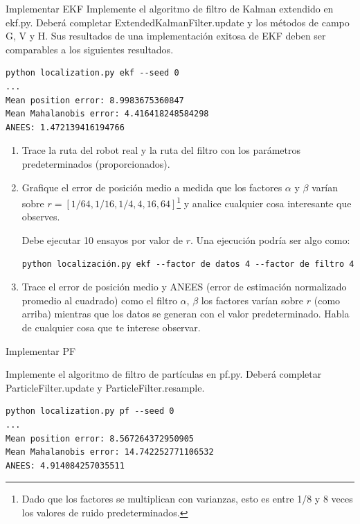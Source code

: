 \documentclass[tp]{lcc}
\begin{document}
	\ejercicio Implementar EKF
	Implemente el algoritmo de filtro de Kalman extendido en ekf.py. Deberá completar ExtendedKalmanFilter.update
	y los métodos de campo G, V y H. Sus resultados de una implementación exitosa de EKF deben ser comparables
	a los siguientes resultados.

\begin{lstlisting}[style=bash] 
python localization.py ekf --seed 0
...
Mean position error: 8.9983675360847
Mean Mahalanobis error: 4.416418248584298
ANEES: 1.472139416194766
\end{lstlisting}


	\begin{enumerate}
		\item Trace la ruta del robot real y la ruta del filtro con los parámetros predeterminados (proporcionados).
		\item  Grafique el error de posición medio a medida que los factores $\alpha$ y $\beta$ varían sobre $r = [1/64, 1/16, 1/4, 4, 16, 64]$\footnote{Dado que los factores se multiplican con varianzas, esto es entre 1/8 y 8 veces los valores de ruido predeterminados.} y analice cualquier cosa interesante que observes.
		
		Debe ejecutar 10 ensayos por valor de $r$. Una ejecución podría ser algo como:

\begin{lstlisting}[style=bash] 
python localización.py ekf --factor de datos 4 --factor de filtro 4
\end{lstlisting}

		\item Trace el error de posición medio y ANEES (error de estimación normalizado promedio al cuadrado) como el filtro $\alpha$, $\beta$ los factores varían sobre $r$ (como arriba) mientras que los datos se generan con el valor predeterminado. Habla de cualquier cosa que te interese observar.
	\end{enumerate}


	\ejercicio Implementar PF
	
	Implemente el algoritmo de filtro de partículas en pf.py. Deberá completar ParticleFilter.update y ParticleFilter.resample.

\begin{lstlisting}[style=bash] 
python localization.py pf --seed 0
...
Mean position error: 8.567264372950905
Mean Mahalanobis error: 14.742252771106532
ANEES: 4.914084257035511
\end{lstlisting}
\end{document}
